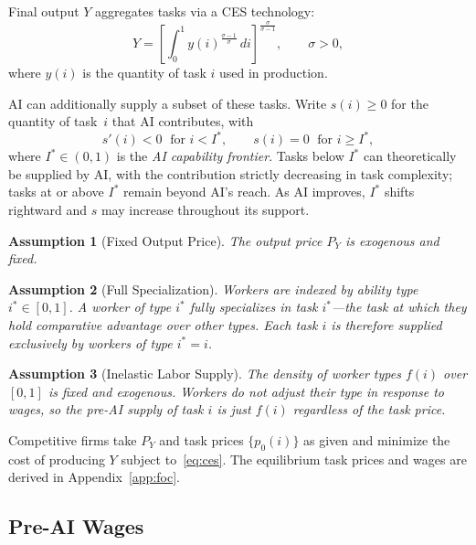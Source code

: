 \documentclass[11pt]{article}
\theoremstyle{plain}
\newtheorem{assumption}{Assumption}
\theoremstyle{remark}
\begin{document}
Final output $Y$ aggregates tasks via a CES technology:
\begin{equation}
  Y = \left[\int_0^1 y(i)^{\frac{\sigma-1}{\sigma}}\,di\right]^{\!\frac{\sigma}{\sigma-1}},
  \qquad \sigma > 0,
  \label{eq:ces}
\end{equation}
where $y(i)$ is the quantity of task $i$ used in production.

AI can additionally supply a subset of these tasks.  Write $s(i)\geq 0$
for the quantity of task~$i$ that AI contributes, with
\begin{equation}
  s'(i) < 0 \;\text{ for } i<I^*,
  \qquad
  s(i) = 0 \;\text{ for } i \geq I^*,
  \label{eq:ai_supply}
\end{equation}
where $I^*\in(0,1)$ is the \textit{AI capability frontier}.  Tasks below $I^*$
can theoretically be supplied by AI, with the contribution strictly decreasing in
task complexity; tasks at or above $I^*$ remain beyond AI's reach.  As AI
improves, $I^*$ shifts rightward and $s$ may increase throughout its support.

\begin{assumption}[Fixed Output Price]
  The output price $P_Y$ is exogenous and fixed.
\end{assumption}

\begin{assumption}[Full Specialization]
  Workers are indexed by ability type $i^*\in[0,1]$.  A worker of type $i^*$ fully specializes in task
  $i^*$---the task at which they hold comparative
  advantage over other types.  Each task $i$ is therefore supplied exclusively by workers of
  type $i^*=i$.
\end{assumption}

\begin{assumption}[Inelastic Labor Supply]
  The density of worker types $f(i)$ over $[0,1]$ is fixed and exogenous.  Workers do not
  adjust their type in response to wages, so the pre-AI supply of task $i$ is just $f(i)$
  regardless of the task price.
\end{assumption}

\noindent Competitive firms take $P_Y$ and task prices $\{p_0(i)\}$ as given and minimize the
cost of producing $Y$ subject to~\eqref{eq:ces}.  The equilibrium task prices and wages are derived
in Appendix~\ref{app:foc}.





\subsection{Pre-AI Wages}
\end{document}
